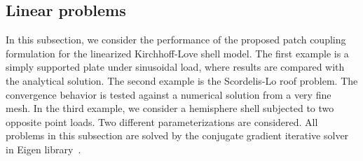 \subsection{Linear problems}

In this subsection, we consider the performance of the proposed patch coupling formulation for the linearized Kirchhoff-Love shell model. The first example is a simply supported plate under sinusoidal load, where results are compared with the analytical solution. The second example is the Scordelis-Lo roof problem. The convergence behavior is tested against a numerical solution from a very fine mesh. In the third example, we consider a hemisphere shell subjected to two opposite point loads. Two different parameterizations are considered. All problems in this subsection are solved by the conjugate gradient iterative solver in Eigen library~\cite{eigenweb}.

